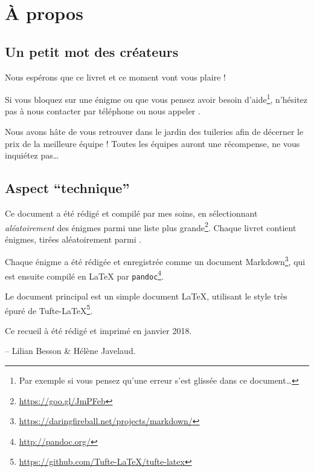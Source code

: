 \chapter{À propos}

\section*{Un petit mot des créateurs}

Nous espérons que ce livret et ce moment vont vous plaire !

Si vous bloquez sur une énigme ou que vous pensez avoir besoin d'aide\footnote{Par exemple si vous pensez qu'une erreur s'est glissée dans ce document…}, n'hésitez pas à nous contacter par téléphone ou nous appeler
.

Nous avons hâte de vous retrouver dans le jardin des tuileries afin de décerner le prix de la meilleure équipe !
Toutes les équipes auront une récompense, ne vous inquiétez pas…


\section*{Aspect ``technique''}
Ce document a été rédigé et compilé par mes soins, en sélectionnant \emph{aléatoirement} des énigmes parmi une liste plus grande\footnote{\url{https://goo.gl/JmPFeb}}.
Chaque livret contient \nbenigmes{} énigmes, tirées aléatoirement parmi \totalnbenigmes.

Chaque énigme a été rédigée et enregistrée comme un document Markdown\footnote{\url{https://daringfireball.net/projects/markdown/}},
qui est ensuite compilé en \LaTeX{} par \texttt{pandoc}\footnote{\url{http://pandoc.org/}}.

Le document principal est un simple document \LaTeX,
utilisant le style très épuré de Tufte-\LaTeX{}\footnote{\url{https://github.com/Tufte-LaTeX/tufte-latex}}.

Ce recueil à été rédigé et imprimé en janvier 2018.

-- Lilian Besson \& Hélène Javelaud.